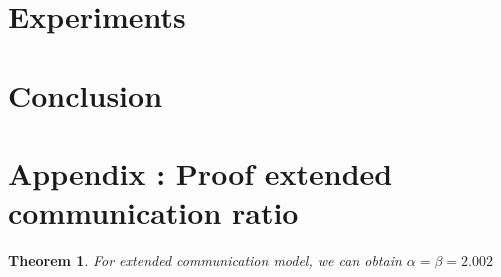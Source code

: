 \documentclass{article}
\newtheorem{theorem}{Theorem}
\begin{document}
\section{Experiments}

\section{Conclusion}





\appendix
\newpage
\section{Appendix : Proof extended communication ratio}


\begin{theorem}
For extended communication model, we can obtain $\alpha=\beta=2.002$
\end{theorem}
\end{document}
